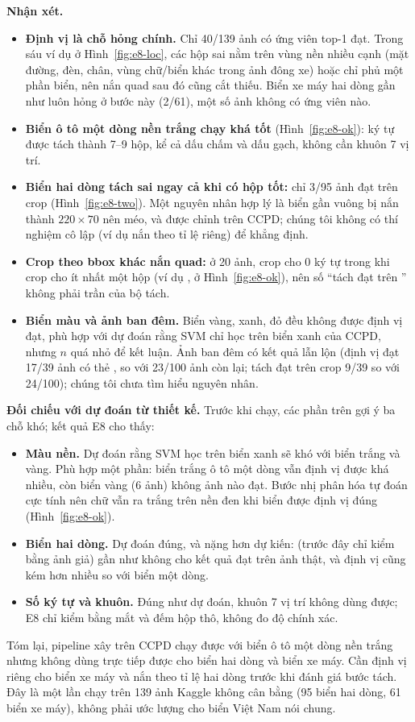 \textbf{Nhận xét.}
\begin{itemize}
  \item \textbf{Định vị là chỗ hỏng chính.} Chỉ 40/139 ảnh có ứng viên top-1 đạt. Trong sáu ví dụ ở Hình~\ref{fig:e8-loc}, các hộp sai nằm trên vùng nền nhiều cạnh (mặt đường, đèn, chân, vùng chữ/biển khác trong ảnh đông xe) hoặc chỉ phủ một phần biển, nên nắn quad sau đó cũng cắt thiếu. Biển xe máy hai dòng gần như luôn hỏng ở bước này (2/61), một số ảnh không có ứng viên nào.
  \item \textbf{Biển ô tô một dòng nền trắng chạy khá tốt} (Hình~\ref{fig:e8-ok}): ký tự được tách thành 7--9 hộp, kể cả dấu chấm và dấu gạch, không cần khuôn 7 vị trí.
  \item \textbf{Biển hai dòng tách sai ngay cả khi có hộp tốt:} chỉ 3/95 ảnh đạt trên crop  (Hình~\ref{fig:e8-two}). Một nguyên nhân hợp lý là biển gần vuông bị nắn thành $220\times 70$ nên méo, và  được chỉnh trên CCPD; chúng tôi không có thí nghiệm cô lập (ví dụ nắn theo tỉ lệ riêng) để khẳng định.
  \item \textbf{Crop theo bbox khác nắn quad:} ở 20 ảnh, crop  cho 0 ký tự trong khi crop  cho ít nhất một hộp (ví dụ ,  ở Hình~\ref{fig:e8-ok}), nên số ``tách đạt trên '' không phải trần của bộ tách.
  \item \textbf{Biển màu và ảnh ban đêm.} Biển vàng, xanh, đỏ đều không được định vị đạt, phù hợp với dự đoán rằng SVM chỉ học trên biển xanh của CCPD, nhưng $n$ quá nhỏ để kết luận. Ảnh ban đêm có kết quả lẫn lộn (định vị đạt 17/39 ảnh có thẻ , so với 23/100 ảnh còn lại; tách đạt trên crop  9/39 so với 24/100); chúng tôi chưa tìm hiểu nguyên nhân.
\end{itemize}

\textbf{Đối chiếu với dự đoán từ thiết kế.} Trước khi chạy, các phần trên gợi ý ba chỗ khó; kết quả E8 cho thấy:
\begin{itemize}
  \item \textbf{Màu nền.} Dự đoán rằng SVM học trên biển xanh sẽ khó với biển trắng và vàng. Phù hợp một phần: biển trắng ô tô một dòng vẫn định vị được khá nhiều, còn biển vàng (6 ảnh) không ảnh nào đạt. Bước nhị phân hóa tự đoán cực tính nên chữ vẫn ra trắng trên nền đen khi biển được định vị đúng (Hình~\ref{fig:e8-ok}).
  \item \textbf{Biển hai dòng.} Dự đoán đúng, và nặng hơn dự kiến:  (trước đây chỉ kiểm bằng ảnh giả) gần như không cho kết quả đạt trên ảnh thật, và định vị cũng kém hơn nhiều so với biển một dòng.
  \item \textbf{Số ký tự và khuôn.} Đúng như dự đoán, khuôn 7 vị trí không dùng được; E8 chỉ kiểm bằng mắt và đếm hộp thô, không đo độ chính xác.
\end{itemize}
Tóm lại, pipeline xây trên CCPD chạy được với biển ô tô một dòng nền trắng nhưng không dùng trực tiếp được cho biển hai dòng và biển xe máy. Cần định vị riêng cho biển xe máy và nắn theo tỉ lệ hai dòng trước khi đánh giá bước tách. Đây là một lần chạy trên 139 ảnh Kaggle không cân bằng (95 biển hai dòng, 61 biển xe máy), không phải ước lượng cho biển Việt Nam nói chung.

